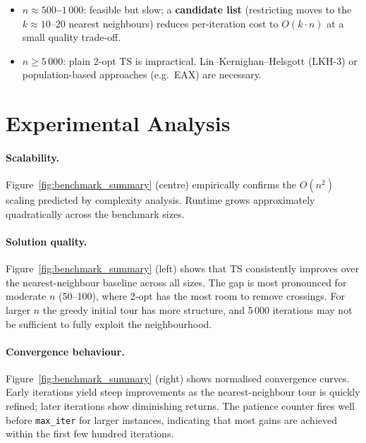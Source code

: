 \documentclass[12pt,a4paper]{article}
\begin{document}
\begin{itemize}[leftmargin=1.5em]
  \item \textbf{$n \approx 500$--$1\,000$}: feasible but slow; a
    \textbf{candidate list} (restricting moves to the $k \approx 10$--$20$
    nearest neighbours) reduces per-iteration cost to $O(k \cdot n)$
    at a small quality trade-off.
  \item \textbf{$n \geq 5\,000$}: plain 2-opt TS is impractical.
    Lin--Kernighan--Helsgott (LKH-3) or population-based approaches
    (e.g.\ EAX) are necessary.
\end{itemize}

\section{Experimental Analysis}
\label{sec:experimental}

\paragraph{Scalability.}
Figure~\ref{fig:benchmark_summary} (centre) empirically confirms the $O(n^2)$
scaling predicted by complexity analysis.
Runtime grows approximately quadratically across the benchmark sizes.

\paragraph{Solution quality.}
Figure~\ref{fig:benchmark_summary} (left) shows that TS consistently improves
over the nearest-neighbour baseline across all sizes.
The gap is most pronounced for moderate $n$ (50--100), where 2-opt has
the most room to remove crossings.
For larger $n$ the greedy initial tour has more structure, and 5\,000
iterations may not be sufficient to fully exploit the neighbourhood.

\paragraph{Convergence behaviour.}
Figure~\ref{fig:benchmark_summary} (right) shows normalised convergence curves.
Early iterations yield steep improvements as the nearest-neighbour tour is
quickly refined; later iterations show diminishing returns.
The patience counter fires well before \texttt{max\_iter} for larger instances,
indicating that most gains are achieved within the first few hundred iterations.
\end{document}

